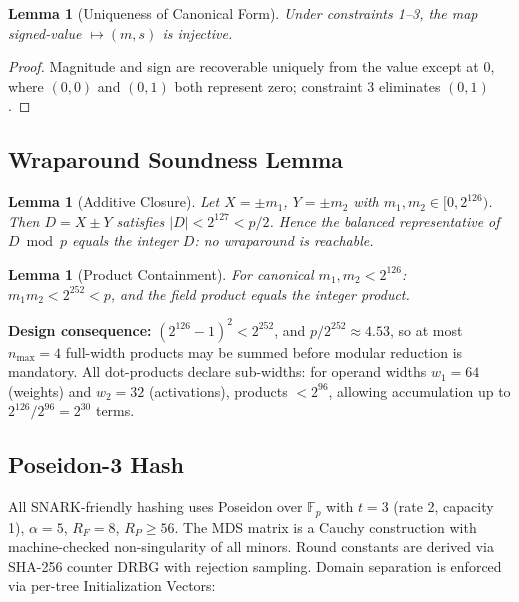 \documentclass[11pt, a4paper]{article}
\newtheorem{lemma}[theorem]{Lemma}
\begin{document}
\begin{lemma}[Uniqueness of Canonical Form]
Under constraints 1--3, the map signed-value $\mapsto (m,s)$ is injective.
\end{lemma}
\begin{proof}
Magnitude and sign are recoverable uniquely from the value except at $0$, where $(0,0)$ and $(0,1)$ both represent zero; constraint 3 eliminates $(0,1)$.
\end{proof}

\subsection{Wraparound Soundness Lemma}

\begin{lemma}[Additive Closure]
Let $X = \pm m_1$, $Y = \pm m_2$ with $m_1, m_2 \in [0, 2^{126})$. Then $D = X \pm Y$ satisfies $|D| < 2^{127} < p/2$. Hence the balanced representative of $D \bmod p$ equals the integer $D$: no wraparound is reachable.
\end{lemma}

\begin{lemma}[Product Containment]
For canonical $m_1, m_2 < 2^{126}$: $m_1 m_2 < 2^{252} < p$, and the field product equals the integer product.
\end{lemma}

\textbf{Design consequence:} $(2^{126}-1)^2 < 2^{252}$, and $p/2^{252} \approx 4.53$, so at most $n_{\max} = 4$ full-width products may be summed before modular reduction is mandatory. All dot-products declare sub-widths: for operand widths $w_1 = 64$ (weights) and $w_2 = 32$ (activations), products $< 2^{96}$, allowing accumulation up to $2^{126}/2^{96} = 2^{30}$ terms.

\subsection{Poseidon-3 Hash}

All SNARK-friendly hashing uses Poseidon over $\mathbb{F}_p$ with $t = 3$ (rate 2, capacity 1), $\alpha = 5$, $R_F = 8$, $R_P \ge 56$. The MDS matrix is a Cauchy construction with machine-checked non-singularity of all minors. Round constants are derived via SHA-256 counter DRBG with rejection sampling. Domain separation is enforced via per-tree Initialization Vectors:
\end{document}
